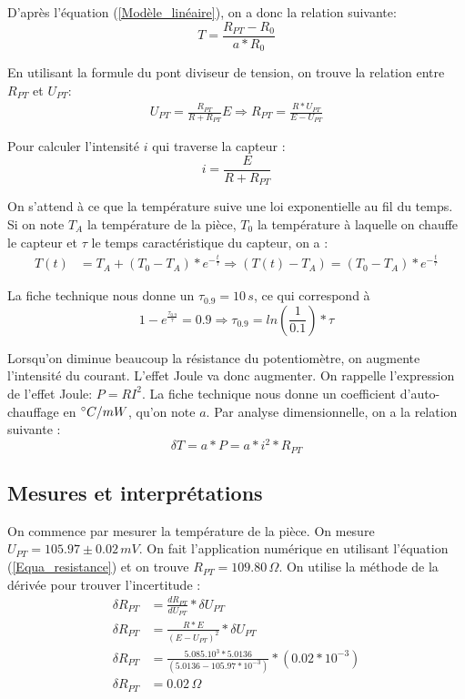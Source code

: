 \documentclass[12pt]{article}
\begin{document}
D'après l'équation (\ref{Modèle_linéaire}), on a donc la relation suivante:
\begin{equation}
T=\frac{R_{PT}-R_0}{a*R_0}
\label{Equation_température}
\end{equation}

En utilisant la formule du pont diviseur de tension, on trouve la relation entre $R_{PT}$ et $U_{PT}$:
\begin{align}
U_{PT}=\frac{R_{PT}}{R+R_{PT}}E \Rightarrow R_{PT}=\frac{R*U_{PT}}{E-U_{PT}}
\label{Equa_resistance}
\end{align}

Pour calculer l'intensité $i$ qui traverse la capteur : 
\begin{equation}
i=\frac{E}{R+R_{PT}}
\label{Equa_intensité}
\end{equation}

On s'attend à ce que la température suive une loi exponentielle au fil du temps. Si on note $T_A$ la température de la pièce, $T_0$ la température à laquelle on chauffe le capteur et $\tau$ le temps caractéristique du capteur, on a :
\begin{align}
T(t)&=T_A+(T_0-T_A)*e^{-\frac{t}{\tau}}\Rightarrow
(T(t)-T_A)=(T_0-T_A)*e^{-\frac{t}{\tau}}
\label{exponentielle}
\end{align}   

La fiche technique nous donne un $\tau_{0.9}=10\, s$, ce qui correspond à 
\begin{equation}
1-e^{\frac{\tau_{0.9}}{\tau}}=0.9 \Rightarrow \tau_{0.9}=ln(\frac{1}{0.1})*\tau
\label{Equa_tempsréponse}
\end{equation}

Lorsqu'on diminue beaucoup la résistance du potentiomètre, on augmente l'intensité du courant. L'effet Joule va donc augmenter. On rappelle l'expression de l'effet Joule: $P=RI^2$. La fiche technique nous donne un coefficient d'auto-chauffage en $\degree C/mW$, qu'on note $a$. Par analyse dimensionnelle, on a la relation suivante :
\begin{equation}
\delta T=a*P=a*i^2*R_{PT}
\label{Equation_puissance}
\end{equation}



\subsection{Mesures et interprétations}

On commence par mesurer la température de la pièce. On mesure $U_{PT}=105.97\pm 0.02\, mV$. On fait l'application numérique en utilisant l'équation (\ref{Equa_resistance}) et on trouve $R_{PT}=109.80\, \Omega$. On utilise la méthode de la dérivée pour trouver l'incertitude :
\begin{align*}
\delta R_{PT}&=\frac{dR_{PT}}{dU_{PT}}*\delta U_{PT} \\
\delta R_{PT}&=\frac{R*E}{(E-U_{PT})^2}*\delta U_{PT} \\
\delta R_{PT}&=\frac{5.085.10^{3}*5.0136}{(5.0136-105.97*10^{-3})}*(0.02*10^{-3})\\
\delta R_{PT}&=0.02\, \Omega
\end{align*}
\end{document}
